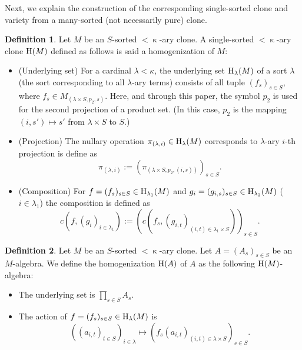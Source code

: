 \documentclass[a4paper,10pt]{article}
\theoremstyle{definition}
\newtheorem{df}{Definition}[section]
\newcommand\mc{\mathclose}
\begin{document}
Next, we explain the construction of the corresponding
single-sorted clone and variety from a many-sorted (not necessarily pure) clone.

\begin{df}\label{homog-clone}
Let $M$ be an $S$-sorted $<\mc\kappa$-ary clone.
A single-sorted $<\mc\kappa$-ary clone ${\rm H}(M)$ defined as follows is
said a homogenization of $M$:
\begin{itemize}
\item (Underlying set)
For a cardinal $\lambda<\kappa$, the underlying set ${\rm H}_\lambda(M)$ of a sort $\lambda$
(the sort corresponding to all $\lambda$-ary terms) consists of all tuple
$(f_s)_{s\in S}$, where $f_s\in M_{(\lambda\times S,p_2,s)}$.
Here, and through this paper, the symbol $p_2$ is used for the second projection
of a product set.
(In this case, $p_2$ is the mapping $(i,s')\mapsto s'$ from $\lambda\times S$ to $S$.)
\item (Projection) The nullary operation $\pi_{(\lambda,i)}\in {\rm H}_\lambda(M)$ corresponds to
$\lambda$-ary $i$-th projection is define as
\[
\pi_{(\lambda,i)}:=(\pi_{(\lambda\times S,p_2,(i,s))})_{s\in S}.
\]
\item (Composition)
For $f=(f_s)_{s\in S}\in {\rm H}_{\lambda_1}(M)$ and
$g_i=(g_{i,s})_{s\in S}\in {\rm H}_{\lambda_2}(M)$ ($i\in \lambda_1$)
the composition is defined as
\[
c(f,(g_i)_{i\in\lambda_1}):=(c(f_s,(g_{i,t})_{(i,t)\in\lambda_1\times S}))_{s\in S}.
\]
\end{itemize}
\end{df}

\begin{df}\label{homog-alg}
Let $M$ be an $S$-sorted $<\mc\kappa$-ary clone.
Let $A=(A_s)_{s\in S}$ be an $M$-algebra.
We define the homogenization ${\rm H}(A)$ of $A$ as the following ${\rm H}(M)$-algebra:
\begin{itemize}
\item
The underlying set is $\prod_{s\in S}A_s$.
\item
The action of $f=(f_s)_{s\in S}\in {\rm H}_\lambda(M)$ is
\[
((a_{i,t})_{t\in S})_{i\in\lambda}\mapsto (f_s(a_{i,t})_{(i,t)\in\lambda\times S})_{s\in S}.
\]
\end{itemize}
\end{df}
\end{document}
